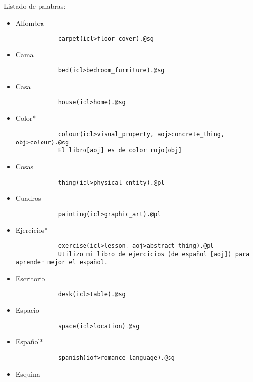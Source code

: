 \documentclass{article}
\begin{document}
    Listado de palabras:
    \begin{itemize}
        \item Alfombra
        \begin{verbatim}
            carpet(icl>floor_cover).@sg
        \end{verbatim}
        \item Cama
        \begin{verbatim}
            bed(icl>bedroom_furniture).@sg
        \end{verbatim}
        \item Casa
        \begin{verbatim}
            house(icl>home).@sg
        \end{verbatim}
        \item Color*
        \begin{verbatim}
            colour(icl>visual_property, aoj>concrete_thing, obj>colour).@sg
            El libro[aoj] es de color rojo[obj] 
        \end{verbatim}
        \item Cosas
        \begin{verbatim}
            thing(icl>physical_entity).@pl
        \end{verbatim}
        \item Cuadros
        \begin{verbatim}
            painting(icl>graphic_art).@pl
        \end{verbatim}
        \item Ejercicios*
        \begin{verbatim}
            exercise(icl>lesson, aoj>abstract_thing).@pl
            Utilizo mi libro de ejercicios (de español [aoj]) para aprender mejor el español.
        \end{verbatim}
        \item Escritorio
        \begin{verbatim}
            desk(icl>table).@sg
        \end{verbatim}
        \item Espacio
        \begin{verbatim}
            space(icl>location).@sg
        \end{verbatim}
        \item Español*
        \begin{verbatim}
            spanish(iof>romance_language).@sg
        \end{verbatim}
        \item Esquina

\end{itemize}
\end{document}
